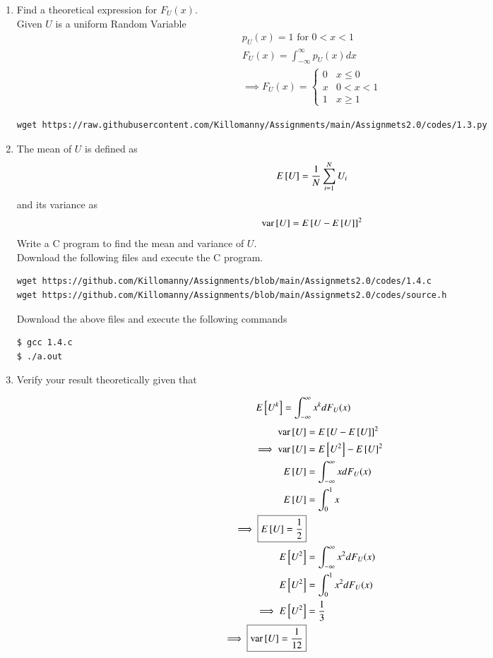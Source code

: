 \documentclass[journal,12pt,twocolumn]{IEEEtran}
\renewcommand\thesection{\arabic{section}}
\begin{document}
\begin{enumerate}[label=\thesection.\arabic*
,ref=\thesection.\theenumi]
\begin{figure}[!h]
\caption{The CDF of $U$}
\label{fig:1.2}
\end{figure}
%
\item
Find a  theoretical expression for $F_{U}(x)$.\\
\solution Given $U$ is a uniform Random Variable
\begin{align}
p_{U}(x)=1 \text{ for } 0 < x < 1 \\
F_U(x)=\int_{-\infty}^{\infty}p_{U}(x)dx\\
\boxed{\implies F_U(x)=
\begin{cases}
 0 &x\le0\\
 x &0< x< 1\\
 1 &x\ge 1
\end{cases}}
\end{align}
\begin{lstlisting}
wget https://raw.githubusercontent.com/Killomanny/Assignments/main/Assignmets2.0/codes/1.3.py
\end{lstlisting}
\item
The mean of $U$ is defined as
%
\begin{equation}
E{}\left[U\right] = \frac{1}{N}\sum_{i=1}^{N}U_i
\end{equation}
%
and its variance as
%
\begin{equation}
\text{var}{}\left[U\right] = E{}\left[U- E{}\left[U\right]\right]^2 
\end{equation}
Write a C program to  find the mean and variance of $U$. \\
\solution Download the following files and execute the  C program.
\begin{lstlisting}
wget https://github.com/Killomanny/Assignments/blob/main/Assignmets2.0/codes/1.4.c
wget https://github.com/Killomanny/Assignments/blob/main/Assignmets2.0/codes/source.h
\end{lstlisting}
Download the above files and execute the following commands
\begin{lstlisting}
$ gcc 1.4.c
$ ./a.out
\end{lstlisting}
\item Verify your result theoretically given that
\end{enumerate}
%
\begin{equation}
E{}\left[U^k\right] = \int_{-\infty}^{\infty}x^kdF_{U}(x)
\end{equation}
\solution 
\begin{align}
    \text{var}{}\left[U\right] &= E{}\left[U- E{}\left[U\right]\right]^2\\ 
    \implies \text{var}{}\left[U\right] &= E{}\left[U^2\right]- E{}\left[U\right]^2 \\
    E{}\left[U\right]&=\int_{-\infty}^{\infty}xdF_U(x)\\
    E{}\left[U\right]&=\int_{0}^{1}x\\
    \implies \boxed{E{}\left[U\right]=\frac{1}{2}}\\
    E{}\left[U^2\right]&=\int_{-\infty}^{\infty}x^{2}dF_U(x)\\
    E{}\left[U^2\right]&=\int_{0}^{1}x^{2}dF_U(x)\\
    \implies E{}\left[U^2\right]&=\frac{1}{3}\\
    \implies \boxed{\text{var}{}\left[U\right]=\frac{1}{12}}
\end{align}
\end{document}
